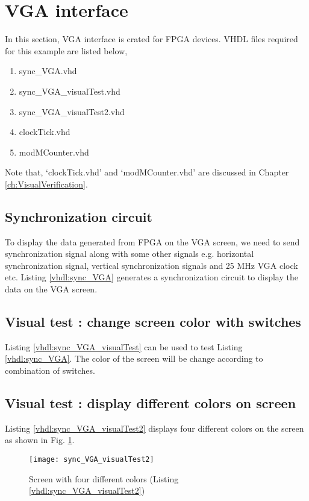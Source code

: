 \section{VGA interface}
In this section, VGA interface is crated for FPGA devices. VHDL files required for this example are listed below, 
\begin{enumerate}
	\item sync\_VGA.vhd
	\item sync\_VGA\_visualTest.vhd
	\item sync\_VGA\_visualTest2.vhd
	\item clockTick.vhd
	\item modMCounter.vhd
\end{enumerate}
Note that, `clockTick.vhd' and `modMCounter.vhd' are discussed in Chapter \ref{ch:VisualVerification}.

\subsection{Synchronization circuit}
To display the data generated from FPGA on the VGA screen, we need to send synchronization signal along with some other signals e.g. horizontal synchronization signal, vertical synchronization signals and 25 MHz VGA clock etc. Listing \ref{vhdl:sync_VGA} generates a synchronization circuit to display the data on the VGA screen.   


\subsection{Visual test : change screen color with switches}
Listing \ref{vhdl:sync_VGA_visualTest} can be used to test Listing \ref{vhdl:sync_VGA}. The color of the screen will be change according to combination of switches. 



\subsection{Visual test : display different colors on screen}
Listing \ref{vhdl:sync_VGA_visualTest2} displays four different colors on the screen as shown in Fig. \ref{fig:sync_VGA_visualTest2}. 

\begin{figure}[!h]
	\centering
	\texttt{[image: sync\_VGA\_visualTest2]}
	\caption{Screen with four different colors (Listing \ref{vhdl:sync_VGA_visualTest2})}
	\label{fig:sync_VGA_visualTest2}
\end{figure}


